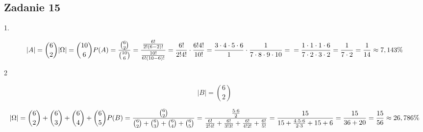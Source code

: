 \subsection{Zadanie 15}

1.

$$
|A| = {6\choose2}\\
|\Omega| = {10\choose 6}\\
P(A) = \frac{{6\choose2}}{{10\choose 6}} = \frac{\frac{6!}{2!(6-2)!}}{\frac{10!}{6!(10-6)!}}
= \frac{6!}{2!4!}\cdot\frac{6!4!}{10!} = \frac{3\cdot4\cdot5\cdot6}{1}\cdot\frac{1}{7\cdot8\cdot9\cdot10}=\\
=\frac{1\cdot1\cdot1\cdot6}{7\cdot2\cdot3\cdot2}=\frac{1}{7\cdot2}=\frac{1}{14}\approx7,143\%
$$

2

$$
|B|={6\choose2}
$$


$$
|\Omega|={6\choose2}+{6\choose3}+{6\choose4}+{6\choose5}\\
P(B) = \frac{{6\choose2}}{{6\choose2}+{6\choose3}+{6\choose4}+{6\choose5}}=
\frac{\frac{5\cdot6}{2}}{\frac{6!}{2!4!}+\frac{6!}{3!3!}+\frac{6!}{4!2!}+\frac{6!}{5!}}=\\
\frac{15}{15+\frac{4\cdot5\cdot6}{2\cdot3}+15+6}
=\frac{15}{36+20}=\frac{15}{56}\approx26,786\%
$$

